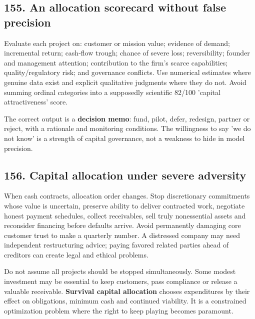 \subsection{155. An allocation scorecard without false precision}


Evaluate each project on: customer or mission value; evidence of demand; incremental return; cash-flow trough; chance of severe loss; reversibility; founder and management attention; contribution to the firm's scarce capabilities; quality/regulatory risk; and governance conflicts. Use numerical estimates where genuine data exist and explicit qualitative judgments where they do not. Avoid summing ordinal categories into a supposedly scientific 82/100 'capital attractiveness' score.

The correct output is a \textbf{decision memo}: fund, pilot, defer, redesign, partner or reject, with a rationale and monitoring conditions. The willingness to say 'we do not know' is a strength of capital governance, not a weakness to hide in model precision.

\subsection{156. Capital allocation under severe adversity}


When cash contracts, allocation order changes. Stop discretionary commitments whose value is uncertain, preserve ability to deliver contracted work, negotiate honest payment schedules, collect receivables, sell truly nonessential assets and reconsider financing before defaults arrive. Avoid permanently damaging core customer trust to make a quarterly number. A distressed company may need independent restructuring advice; paying favored related parties ahead of creditors can create legal and ethical problems.

Do not assume all projects should be stopped simultaneously. Some modest investment may be essential to keep customers, pass compliance or release a valuable receivable. \textbf{Survival capital allocation} chooses expenditures by their effect on obligations, minimum cash and continued viability. It is a constrained optimization problem where the right to keep playing becomes paramount.

